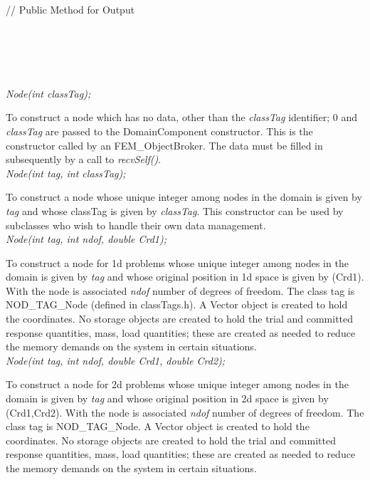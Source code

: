 \indent{}\\ \\
\indent\indent // Public Method for Output \\
\indent{} \\
\indent{} \\ 
\indent{} \\
\indent{} \\



  \\
{\em Node(int classTag);}  

To construct a node which has no data, other than the {\em classTag}
identifier; $0$ and {\em classTag} are passed to the DomainComponent
constructor. This is the constructor called by an
FEM\_ObjectBroker. The data must be filled in subsequently by a call
to {\em recvSelf()}. \\ 

{\em Node(int tag, int classTag);}  

To construct a node whose unique integer among nodes in the
domain is given by {\em tag} and whose classTag is given by {\em
classTag}. This constructor can be used by 
subclasses who wish to handle their own data management. \\ 

{\em Node(int tag, int ndof, double Crd1);}  

To construct a node for 1d problems whose unique integer among nodes in the
domain is given by {\em tag} and whose original position in 1d space
is given by (Crd1). With the node is associated {\em ndof} number
of degrees of freedom. The class tag is NOD\_TAG\_Node (defined in
classTags.h). A Vector object is created to hold the coordinates. No
storage objects are created to hold the trial and committed response
quantities, mass, load quantities; these are created as needed to
reduce the memory demands on the system in certain situations. \\ 

{\em Node(int tag, int ndof, double Crd1, double Crd2);}  

To construct a node for 2d problems whose unique integer among nodes in the
domain is given by {\em tag} and whose original position in 2d space
is given by (Crd1,Crd2). With the node is associated {\em ndof} number
of degrees of freedom. The class tag is NOD\_TAG\_Node. A Vector object
is created to hold the coordinates. No
storage objects are created to hold the trial and committed response
quantities, mass, load quantities; these are created as needed to
reduce the memory demands on the system in certain situations. \\ 

